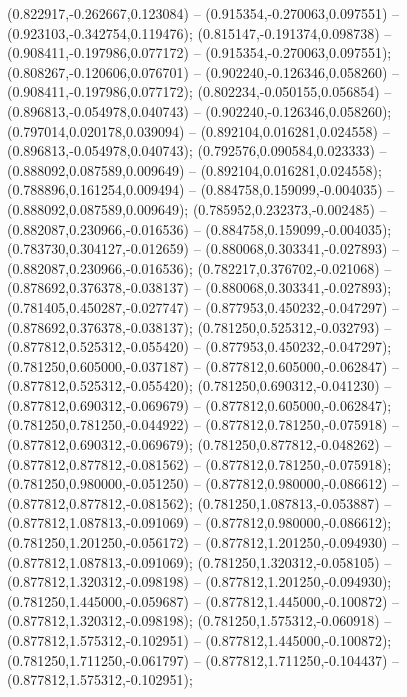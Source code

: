  (0.822917,-0.262667,0.123084) -- (0.915354,-0.270063,0.097551) -- (0.923103,-0.342754,0.119476);
 (0.815147,-0.191374,0.098738) -- (0.908411,-0.197986,0.077172) -- (0.915354,-0.270063,0.097551);
 (0.808267,-0.120606,0.076701) -- (0.902240,-0.126346,0.058260) -- (0.908411,-0.197986,0.077172);
 (0.802234,-0.050155,0.056854) -- (0.896813,-0.054978,0.040743) -- (0.902240,-0.126346,0.058260);
 (0.797014,0.020178,0.039094) -- (0.892104,0.016281,0.024558) -- (0.896813,-0.054978,0.040743);
 (0.792576,0.090584,0.023333) -- (0.888092,0.087589,0.009649) -- (0.892104,0.016281,0.024558);
 (0.788896,0.161254,0.009494) -- (0.884758,0.159099,-0.004035) -- (0.888092,0.087589,0.009649);
 (0.785952,0.232373,-0.002485) -- (0.882087,0.230966,-0.016536) -- (0.884758,0.159099,-0.004035);
 (0.783730,0.304127,-0.012659) -- (0.880068,0.303341,-0.027893) -- (0.882087,0.230966,-0.016536);
 (0.782217,0.376702,-0.021068) -- (0.878692,0.376378,-0.038137) -- (0.880068,0.303341,-0.027893);
 (0.781405,0.450287,-0.027747) -- (0.877953,0.450232,-0.047297) -- (0.878692,0.376378,-0.038137);
 (0.781250,0.525312,-0.032793) -- (0.877812,0.525312,-0.055420) -- (0.877953,0.450232,-0.047297);
 (0.781250,0.605000,-0.037187) -- (0.877812,0.605000,-0.062847) -- (0.877812,0.525312,-0.055420);
 (0.781250,0.690312,-0.041230) -- (0.877812,0.690312,-0.069679) -- (0.877812,0.605000,-0.062847);
 (0.781250,0.781250,-0.044922) -- (0.877812,0.781250,-0.075918) -- (0.877812,0.690312,-0.069679);
 (0.781250,0.877812,-0.048262) -- (0.877812,0.877812,-0.081562) -- (0.877812,0.781250,-0.075918);
 (0.781250,0.980000,-0.051250) -- (0.877812,0.980000,-0.086612) -- (0.877812,0.877812,-0.081562);
 (0.781250,1.087813,-0.053887) -- (0.877812,1.087813,-0.091069) -- (0.877812,0.980000,-0.086612);
 (0.781250,1.201250,-0.056172) -- (0.877812,1.201250,-0.094930) -- (0.877812,1.087813,-0.091069);
 (0.781250,1.320312,-0.058105) -- (0.877812,1.320312,-0.098198) -- (0.877812,1.201250,-0.094930);
 (0.781250,1.445000,-0.059687) -- (0.877812,1.445000,-0.100872) -- (0.877812,1.320312,-0.098198);
 (0.781250,1.575312,-0.060918) -- (0.877812,1.575312,-0.102951) -- (0.877812,1.445000,-0.100872);
 (0.781250,1.711250,-0.061797) -- (0.877812,1.711250,-0.104437) -- (0.877812,1.575312,-0.102951);
